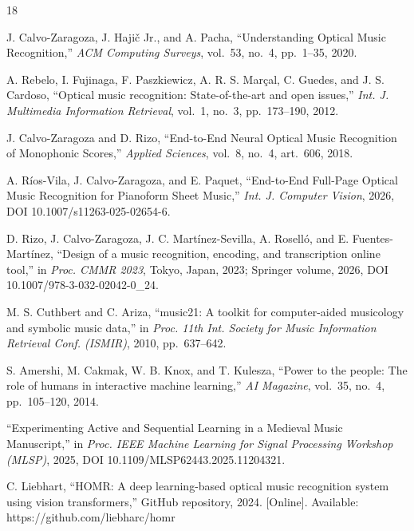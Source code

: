 \begin{thebibliography}{18}

J. Calvo-Zaragoza, J. Haji\v{c} Jr., and A. Pacha, ``Understanding Optical
Music Recognition,'' \emph{ACM Computing Surveys}, vol.~53, no.~4, pp.~1--35,
2020. %

A. Rebelo, I. Fujinaga, F. Paszkiewicz, A. R. S. Mar\c{c}al, C. Guedes, and
J. S. Cardoso, ``Optical music recognition: State-of-the-art and open
issues,'' \emph{Int. J. Multimedia Information Retrieval}, vol.~1, no.~3,
pp.~173--190, 2012. %

J. Calvo-Zaragoza and D. Rizo, ``End-to-End Neural Optical Music
Recognition of Monophonic Scores,'' \emph{Applied Sciences}, vol.~8, no.~4,
art.~606, 2018. %

A. R\'ios-Vila, J. Calvo-Zaragoza, and E. Paquet, ``End-to-End Full-Page
Optical Music Recognition for Pianoform Sheet Music,'' \emph{Int. J.
Computer Vision}, 2026, DOI 10.1007/s11263-025-02654-6. %

D. Rizo, J. Calvo-Zaragoza, J. C. Mart\'inez-Sevilla, A. Rosell\'o, and
E. Fuentes-Mart\'inez, ``Design of a music recognition, encoding, and
transcription online tool,'' in \emph{Proc. CMMR 2023}, Tokyo, Japan, 2023;
Springer volume, 2026, DOI 10.1007/978-3-032-02042-0\_24. %

M. S. Cuthbert and C. Ariza, ``music21: A toolkit for computer-aided
musicology and symbolic music data,'' in \emph{Proc. 11th Int. Society for
Music Information Retrieval Conf. (ISMIR)}, 2010, pp.~637--642. %

S. Amershi, M. Cakmak, W. B. Knox, and T. Kulesza, ``Power to the people:
The role of humans in interactive machine learning,'' \emph{AI Magazine},
vol.~35, no.~4, pp.~105--120, 2014. %

``Experimenting Active and Sequential Learning in a Medieval Music
Manuscript,'' in \emph{Proc. IEEE Machine Learning for Signal Processing
Workshop (MLSP)}, 2025, DOI 10.1109/MLSP62443.2025.11204321. %

C. Liebhart, ``HOMR: A deep learning-based optical music recognition system using vision transformers,'' GitHub repository, 2024. [Online]. Available:
https://github.com/liebharc/homr %


\end{thebibliography}
